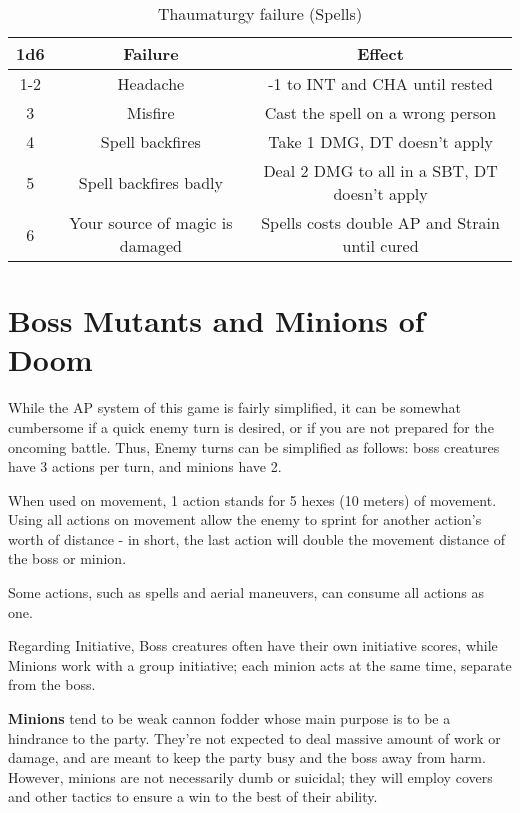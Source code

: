 \documentclass[11pt,a4paper,twocolumn]{book}
\begin{document}
    \begin{table*}[t]
        \centering
        \caption{Thaumaturgy failure (Spells)}
        \begin{tabular}{|c|c|c|}
           \hline
           \textbf{1d6}    & \textbf{Failure}                  & \textbf{Effect} \\    \hline
                1-2         & Headache                          & -1 to INT and CHA until rested \\
                3           & Misfire                           & Cast the spell on a wrong person \\
                4           & Spell backfires                   & Take 1 DMG, DT doesn't apply \\
                5           & Spell backfires badly             & Deal 2 DMG to all in a SBT, DT doesn't apply \\
                6           & Your source of magic is damaged   & Spells costs double AP and Strain until cured \\ \hline
        \end{tabular}
        \label{tab:my_label}
    \end{table*}
    
    \section*{Boss Mutants and Minions of Doom}
    
    While the AP system of this game is fairly simplified, it can be somewhat cumbersome if a quick enemy turn is desired, or if you are not prepared for the oncoming battle. Thus, Enemy turns can be simplified as follows: boss creatures have 3 actions per turn, and minions have 2.
    
    When used on movement, 1 action stands for 5 hexes (10 meters) of movement. Using all actions on movement allow the enemy to sprint for another action's worth of distance - in short, the last action will double the movement distance of the boss or minion.
    
    Some actions, such as spells and aerial maneuvers, can consume all actions as one.
    
    Regarding Initiative, Boss creatures often have their own initiative scores, while Minions work with a group initiative; each minion acts at the same time, separate from the boss.
    
    \textbf{Minions} tend to be weak cannon fodder whose main purpose is to be a hindrance to the party. They're not expected to deal massive amount of work or damage, and are meant to keep the party busy and the boss away from harm. However, minions are not necessarily dumb or suicidal; they will employ covers and other tactics to ensure a win to the best of their ability. 
    
\end{document}
